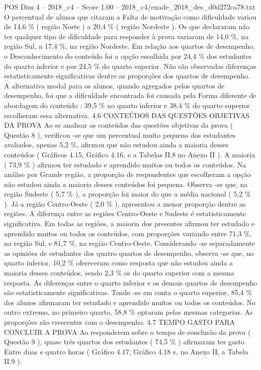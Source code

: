 \begin{textsample}{POS Dim 4 – 2018\_c4 – Score 1.00 – 2018\_c4/enade\_2018\_des\_d0d272ca78.txt}
O percentual de alunos que citaram a Falta de motivação como dificuldade variou de 14,6 \% ( região Norte ) a 20,4 \% ( região Nordeste ).
Os que declararam não ter qualquer tipo de dificuldade para responder à prova variaram de 14,0 \%, na região Sul, a 17,4 \%, na região Nordeste.
Em relação aos quartos de desempenho, o Desconhecimento do conteúdo foi a opção escolhida por 24,4 \% dos estudantes do quarto inferior e por 24,5 \% do quarto superior.
Não são observadas diferenças estatisticamente significativas dentre as proporções dos quartos de desempenho.
A alternativa modal para os alunos, quando agregados pelos quartos de desempenho, foi que a dificuldade encontrada foi causada pela Forma diferente de abordagem do conteúdo : 39,5 \% no quarto inferior e 38,4 \% do quarto superior escolheram essa alternativa. 4.6 CONTEÚDOS DAS QUESTÕES OBJETIVAS DA PROVA Ao se analisar os conteúdos das questões objetivas da prova ( Questão 8 ), verificou -se que um percentual muito pequeno dos estudantes avaliados, apenas 5,2 \%, afirmou que não estudou ainda a maioria desses conteúdos ( Gráficos 4.15, Gráfico 4.16, e a Tabelas II.8 no Anexo II ).
A maioria ( 73,9 \% ) afirmou ter estudado e aprendido muitos ou todos os conteúdos.
Na análise por Grande região, a proporção de respondentes que escolheram a opção não estudou ainda a maioria desses conteúdos foi pequena.
Observa -se que, na região Sudeste ( 5,7 \% ), a proporção foi maior do que a média nacional ( 5,2 \% ).
Já a região Centro-Oeste ( 2,0 \% ), apresentou a menor proporção dentre as regiões.
A diferença entre as regiões Centro-Oeste e Sudeste é estatisticamente significativa.
Em todas as regiões, a maioria dos presentes afirmou ter estudado e aprendido muitos ou todos os conteúdos, com proporções variando entre 71,3 \%, na região Sul, e 81,7 \%, na região Centro-Oeste.
Considerando -se separadamente as opiniões de estudantes dos quatro quartos de desempenho, observa -se que, no quarto inferior, 10,2 \% ofereceram como resposta que não estudou ainda a maioria desses conteúdos, sendo 2,3 \% os do quarto superior com a mesma resposta.
As diferenças entre o quarto inferior e os demais quartos de desempenho são estatisticamente significativas.
Tendo -se em conta o quarto superior, 85,4 \% dos alunos afirmaram ter estudado e aprendido muitos ou todos os conteúdos.
No outro extremo, no primeiro quarto, 58,8 \% optaram pelas mesmas categorias.
As proporções são crescentes com o desempenho. 4.7 TEMPO GASTO PARA CONCLUIR A PROVA Ao responderem sobre o tempo de conclusão da prova ( Questão 9 ), quase três quartos dos estudantes ( 74,5 \% ) afirmaram ter gasto Entre duas e quatro horas ( Gráfico 4.17, Gráfico 4.18 e, no Anexo II, a Tabela II.9 ).

\end{textsample}
